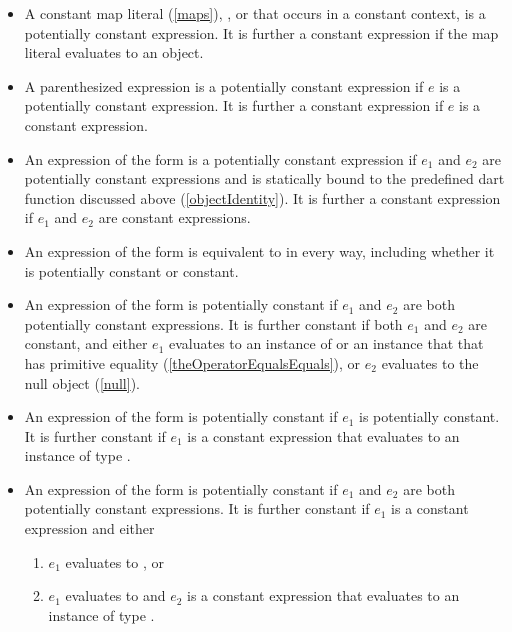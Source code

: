 \documentclass[makeidx]{article}
\begin{document}
{\begin{itemize}
  It is further a constant expression
  if the set literal evaluates to an object.
\item
  A constant map literal (\ref{maps}),
  , or
  that occurs in a constant context,
  is a potentially constant expression.
  It is further a constant expression
  if the map literal evaluates to an object.
\item
  A parenthesized expression  is
  a potentially constant expression
  if $e$ is a potentially constant expression.
  It is further a constant expression if $e$ is a constant expression.
\item
  An expression of the form  is
  a potentially constant expression
  if $e_1$ and $e_2$ are potentially constant expressions
  and  is statically bound to
  the predefined dart function  discussed above
  (\ref{objectIdentity}).
  It is further a constant expression
  if $e_1$ and $e_2$ are constant expressions.
\item
  An expression of the form  is
  equivalent to  in every way,
  including whether it is potentially constant or constant.
\item
  An expression of the form  is potentially constant
  if $e_1$ and $e_2$ are both potentially constant expressions.
  It is further constant if both $e_1$ and $e_2$ are constant, and
  either $e_1$ evaluates to an instance of 
  or an instance that that has primitive equality
  (\ref{theOperatorEqualsEquals}),
  or $e_2$ evaluates to the null object
  (\ref{null}).
\item
  An expression of the form  is potentially constant
  if $e_1$ is potentially constant.
  It is further constant if $e_1$ is a constant expression that evaluates to
  an instance of type .
\item
  An expression of the form  is
  potentially constant if $e_1$ and $e_2$
  are both potentially constant expressions.
  It is further constant if $e_1$ is a constant expression and either
  \begin{enumerate}
  \item $e_1$ evaluates to \FALSE, or
  \item $e_1$ evaluates to \TRUE{} and $e_2$ is a constant expression
    that evaluates to an instance of type .

\end{enumerate}
\end{itemize}}
\end{document}
